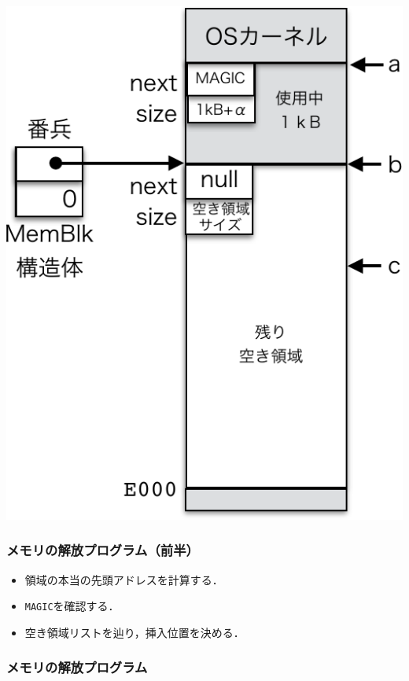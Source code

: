 \documentclass{beamer}                   %
\begin{document}
\begin{frame}
\begin{minipage}{0.49\columnwidth}
\begin{center}
      \includegraphics[scale=0.6]{Fig/mmFree2-crop.pdf}
    \end{center}
  \end{minipage}
\end{frame}

\begin{frame}
  \frametitle{メモリの解放プログラム（前半）}
  

  \begin{itemize}
  \item 領域の本当の先頭アドレスを計算する．
  \item {\tt MAGIC}を確認する．
  \item 空き領域リストを辿り，挿入位置を決める．
  \end{itemize}
\end{frame}

\begin{frame}
  \frametitle{メモリの解放プログラム}
  
\end{frame}
\end{document}
